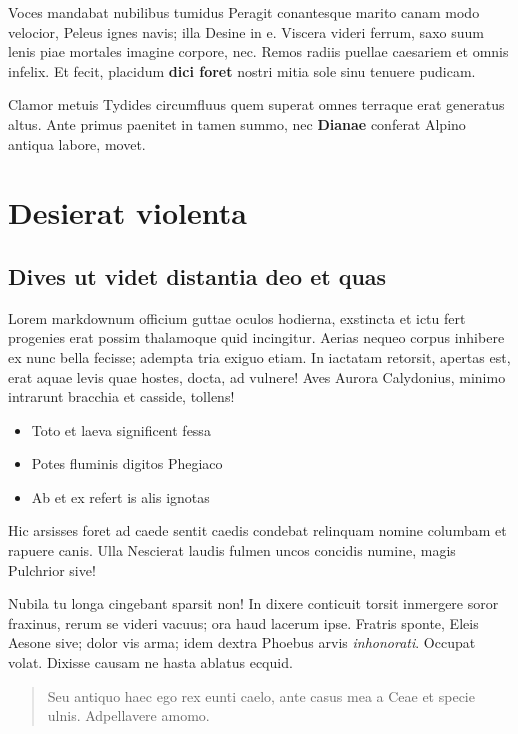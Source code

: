 \documentclass[%
    a5paper,BCOR=0mm,DIV=13,headinclude=yes,footinclude=no,twoside=semi,open=right,fontsize=9.5pt]{
    scrbook}
\providecommand{\tightlist}{%
  \setlength{\itemsep}{0pt}\setlength{\parskip}{0pt}}
\begin{document}
Voces mandabat nubilibus tumidus Peragit conantesque marito canam modo
velocior, Peleus ignes navis; illa Desine in e. Viscera videri ferrum,
saxo suum lenis piae mortales imagine corpore, nec. Remos radiis puellae
caesariem et omnis infelix. Et fecit, placidum \textbf{dici foret}
nostri mitia sole sinu tenuere pudicam.

Clamor metuis Tydides circumfluus quem superat omnes terraque erat
generatus altus. Ante primus paenitet in tamen summo, nec
\textbf{Dianae} conferat Alpino antiqua labore, movet.

\hypertarget{desierat-violenta}{%
\section{Desierat violenta}\label{desierat-violenta}}

\hypertarget{dives-ut-videt-distantia-deo-et-quas}{%
\subsection{Dives ut videt distantia deo et
quas}\label{dives-ut-videt-distantia-deo-et-quas}}

Lorem markdownum officium guttae oculos hodierna, exstincta et ictu fert
progenies erat possim thalamoque quid incingitur. Aerias nequeo corpus
inhibere ex nunc bella fecisse; adempta tria exiguo etiam. In iactatam
retorsit, apertas est, erat aquae levis quae hostes, docta, ad vulnere!
Aves Aurora Calydonius, minimo intrarunt bracchia et casside, tollens!

\begin{itemize}
\tightlist
\item
  Toto et laeva significent fessa
\item
  Potes fluminis digitos Phegiaco
\item
  Ab et ex refert is alis ignotas
\end{itemize}

Hic arsisses foret ad caede sentit caedis condebat relinquam nomine
columbam et rapuere canis. Ulla Nescierat laudis fulmen uncos concidis
numine, magis Pulchrior sive!

Nubila tu longa cingebant sparsit non! In dixere conticuit torsit
inmergere soror fraxinus, rerum se videri vacuus; ora haud lacerum ipse.
Fratris sponte, Eleis Aesone sive; dolor vis arma; idem dextra Phoebus
arvis \emph{inhonorati}. Occupat volat. Dixisse causam ne hasta ablatus
ecquid.

\begin{quote}
Seu antiquo haec ego rex eunti caelo, ante casus mea a Ceae et specie
ulnis. Adpellavere amomo.
\end{quote}
\end{document}
